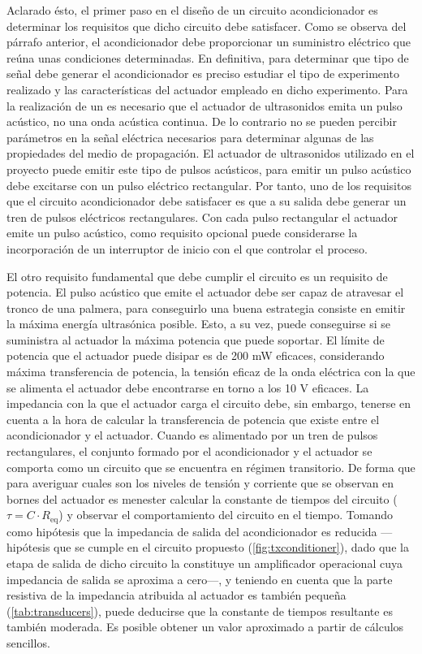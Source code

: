 Aclarado ésto, el primer paso en el diseño de un circuito acondicionador es
determinar los requisitos que dicho circuito debe satisfacer. Como se
observa del párrafo anterior, el acondicionador debe proporcionar un
suministro eléctrico que reúna unas condiciones determinadas. En
definitiva, para determinar que tipo de señal debe generar el
acondicionador es preciso estudiar el tipo de experimento realizado y las
características del actuador empleado en dicho experimento. Para la
realización de un  es necesario que el actuador de ultrasonidos
emita un pulso acústico, no una onda acústica continua. De lo contrario no
se pueden percibir parámetros en la señal eléctrica necesarios para
determinar algunas de las propiedades del medio de propagación. El actuador
de ultrasonidos utilizado en el proyecto puede emitir este tipo de pulsos
acústicos, para emitir un pulso acústico debe excitarse con un pulso
eléctrico rectangular. Por tanto, uno de los requisitos que el circuito
acondicionador debe satisfacer es que a su salida debe generar un tren de
pulsos eléctricos rectangulares. Con cada pulso rectangular el actuador
emite un pulso acústico, como requisito opcional puede considerarse la
incorporación de un interruptor de inicio con el que controlar el proceso.

El otro requisito fundamental que debe cumplir el circuito es un requisito
de potencia. El pulso acústico que emite el actuador debe ser capaz de
atravesar el tronco de una palmera, para conseguirlo una buena estrategia
consiste en emitir la máxima energía ultrasónica posible. Esto, a su vez,
puede conseguirse si se suministra al actuador la máxima potencia que puede
soportar. El límite de potencia que el actuador puede disipar es de 200 mW
eficaces, considerando máxima transferencia de potencia, la tensión eficaz
de la onda eléctrica con la que se alimenta el actuador debe encontrarse en
torno a los 10 V eficaces. La impedancia con la que el actuador carga el
circuito debe, sin embargo, tenerse en cuenta a la hora de calcular la
transferencia de potencia que existe entre el acondicionador y el actuador.
Cuando es alimentado por un tren de pulsos rectangulares, el conjunto
formado por el acondicionador y el actuador se comporta como un circuito
 que se encuentra en régimen transitorio. De forma que para
averiguar cuales son los niveles de tensión y corriente que se observan en
bornes del actuador es menester calcular la constante de tiempos del
circuito ($\tau = C\cdot R_\text{eq}$) y observar el comportamiento del
circuito en el tiempo. Tomando como hipótesis que la impedancia de salida
del acondicionador es reducida ---hipótesis que se cumple en el circuito
propuesto (\cref{fig:txconditioner}), dado que la etapa de salida de dicho
circuito la constituye un amplificador operacional cuya impedancia de
salida se aproxima a cero---, y teniendo en cuenta que la parte resistiva
de la impedancia atribuida al actuador es también pequeña
(\cref{tab:transducers}), puede deducirse que la constante de tiempos
resultante es también moderada. Es posible obtener un valor aproximado a
partir de cálculos sencillos.


